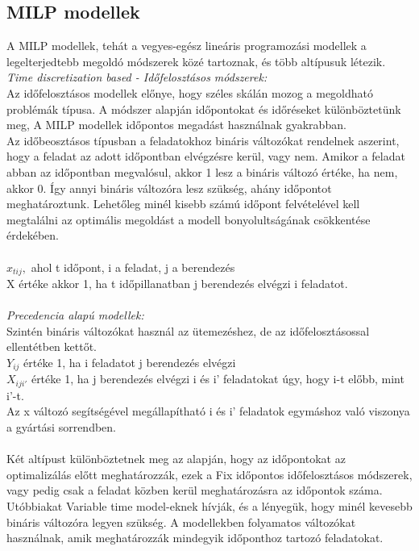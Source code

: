 \documentclass {report}
\begin{document}
\subsection{MILP modellek}
  A MILP modellek, tehát a vegyes-egész lineáris programozási modellek a legelterjedtebb megoldó módszerek közé tartoznak, és több altípusuk létezik.\\
  \emph{Time discretization based - Időfelosztásos módszerek:}\\
   Az időfelosztásos modellek előnye, hogy széles skálán mozog a megoldható problémák típusa.
  A módszer alapján időpontokat és időréseket különböztetünk meg, A MILP modellek időpontos megadást használnak gyakrabban.  \\
  Az időbeosztásos típusban a feladatokhoz bináris változókat rendelnek aszerint, hogy a feladat az adott időpontban elvégzésre kerül, vagy nem. Amikor a feladat abban az időpontban megvalósul, akkor 1 lesz a bináris változó értéke, ha nem, akkor 0. Így annyi bináris változóra lesz szükség, ahány időpontot meghatároztunk. Lehetőleg minél kisebb számú időpont felvételével kell megtalálni az optimális megoldást a modell bonyolultságának csökkentése érdekében.\\\\
  $x_{tij},$ ahol t időpont, i a feladat, j a berendezés\\ X értéke akkor 1, ha t időpillanatban j berendezés elvégzi i feladatot.\\\\
 \emph{Precedencia alapú modellek:}\\
  Szintén bináris változókat használ az ütemezéshez, de az időfelosztásossal ellentétben kettőt. \\
  $Y_{ij}$ értéke 1, ha i feladatot j berendezés elvégzi\\
  $X_{iji'}$ értéke 1, ha j berendezés elvégzi i és i' feladatokat úgy, hogy i-t előbb, mint i'-t.\\
  Az x változó segítségével megállapítható i és i' feladatok egymáshoz való viszonya a gyártási sorrendben. \\\\
 Két altípust különböztetnek meg az alapján, hogy az időpontokat az optimalizálás előtt meghatározzák, ezek a Fix időpontos időfelosztásos módszerek, vagy pedig csak a feladat közben kerül meghatározásra az időpontok száma. Utóbbiakat Variable time model-eknek hívják, és a lényegük, hogy minél kevesebb bináris változóra legyen szükség. A modellekben folyamatos változókat használnak, amik meghatározzák mindegyik időponthoz tartozó feladatokat. 
 
\end{document}
